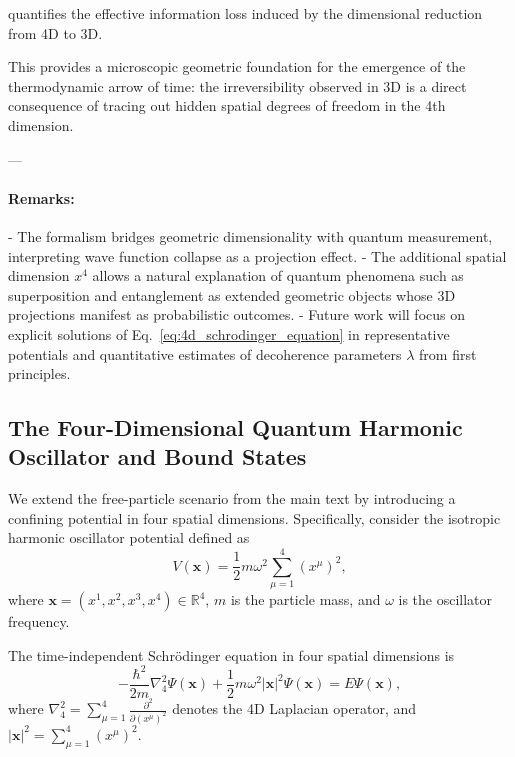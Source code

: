 \documentclass[12pt,a4paper]{article}
\numberwithin{equation}{section}
\begin{document}
quantifies the effective information loss induced by the dimensional reduction from 4D to 3D.

This provides a microscopic geometric foundation for the emergence of the thermodynamic arrow of time: the irreversibility observed in 3D is a direct consequence of tracing out hidden spatial degrees of freedom in the 4th dimension.

---

\paragraph{Remarks:}  

- The formalism bridges geometric dimensionality with quantum measurement, interpreting wave function collapse as a projection effect.
- The additional spatial dimension \(x^4\) allows a natural explanation of quantum phenomena such as superposition and entanglement as extended geometric objects whose 3D projections manifest as probabilistic outcomes.
- Future work will focus on explicit solutions of Eq.~\eqref{eq:4d_schrodinger_equation} in representative potentials and quantitative estimates of decoherence parameters \(\lambda\) from first principles.

\subsection{The Four-Dimensional Quantum Harmonic Oscillator and Bound States}

We extend the free-particle scenario from the main text by introducing a confining potential in four spatial dimensions. Specifically, consider the isotropic harmonic oscillator potential defined as
\begin{equation}
    V(\mathbf{x}) = \frac{1}{2} m \omega^2 \sum_{\mu=1}^4 (x^\mu)^2,
\end{equation}
where \(\mathbf{x} = (x^1, x^2, x^3, x^4) \in \mathbb{R}^4\), \(m\) is the particle mass, and \(\omega\) is the oscillator frequency.

The time-independent Schrödinger equation in four spatial dimensions is
\begin{equation}
    -\frac{\hbar^2}{2m} \nabla_4^2 \Psi(\mathbf{x}) + \frac{1}{2} m \omega^2 |\mathbf{x}|^2 \Psi(\mathbf{x}) = E \Psi(\mathbf{x}),
\end{equation}
where \(\nabla_4^2 = \sum_{\mu=1}^4 \frac{\partial^2}{\partial (x^\mu)^2}\) denotes the 4D Laplacian operator, and \( |\mathbf{x}|^2 = \sum_{\mu=1}^4 (x^\mu)^2 \).
\end{document}
